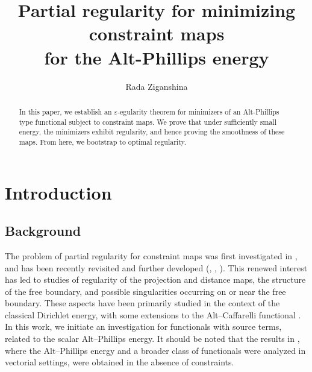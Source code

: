 \documentclass[11pt]{amsart}
\title[Constraint Maps ... Alt--Phillips case]{Partial regularity for minimizing constraint maps \\ for the Alt-Phillips energy}
\author[R.\ Ziganshina]{Rada Ziganshina}
\theoremstyle{plain}
\theoremstyle{definition}
\theoremstyle{remark}
\numberwithin{equation}{section}
\begin{document}
\begin{abstract}
In this paper, we establish an  \texorpdfstring{$\varepsilon$-}regularity theorem for minimizers of an Alt-Phillips type functional subject to constraint maps. We prove  that under sufficiently small energy, the minimizers exhibit regularity, and hence  proving the smoothness of these maps. From here, we  bootstrap to optimal regularity.
\end{abstract}

\maketitle
\setcounter{tocdepth}{1}





\section{Introduction}\label{sec:intro}

\subsection{Background}

The problem of partial regularity for  constraint maps was first investigated in \cite{D}, and has been recently revisited and further developed  (\cite{FKS}, \cite{FGKS1}, \cite{FGKS2}). This renewed interest has led to studies of regularity of the projection and distance maps, the structure of the free boundary, and possible singularities occurring on or near the free boundary. These aspects have been primarily studied in the context of the classical Dirichlet energy, with some extensions to the Alt–Caffarelli functional \cite{FGKS1}. In this work, we initiate an investigation for functionals with source terms, related to 
the scalar Alt–Phillips energy.
It should be noted that the results in \cite{GG, GG2}, where the Alt–Phillips energy and a broader class of functionals were analyzed in vectorial settings, were obtained in the absence of constraints.
\end{document}
